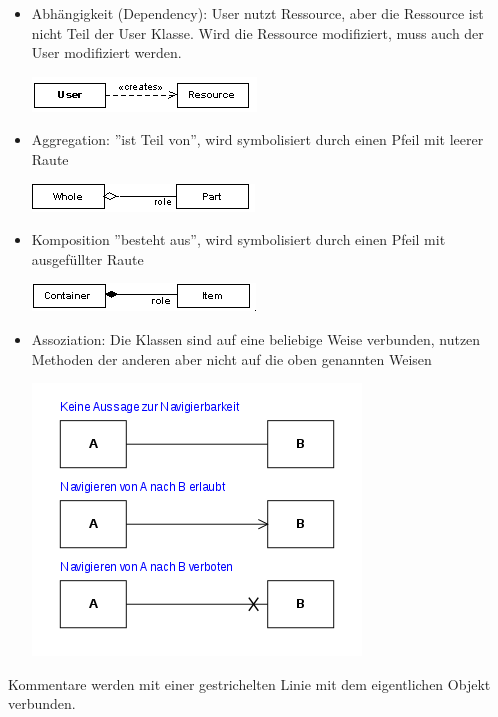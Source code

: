 \documentclass[12pt,a4]{article}
\begin{document}
	 \begin{itemize}
	 	\item Abhängigkeit (Dependency): User nutzt Ressource, aber die Ressource ist nicht Teil der User Klasse. Wird die Ressource modifiziert, muss auch der User modifiziert werden. 
	 		\begin{center}
	 		\includegraphics[width=0.5\linewidth]{images/dependency}
	 		\end{center}

		
	 	\item Aggregation: ''ist Teil von'', wird symbolisiert durch einen Pfeil mit leerer Raute
	 	\begin{center}
	 		\includegraphics[width=0.5\linewidth]{images/aggregation}
	 	\end{center}
	 	\item Komposition ''besteht aus'', wird symbolisiert durch einen Pfeil mit ausgefüllter Raute
	 	\begin{center}
	 		\includegraphics[width=0.5\linewidth]{images/composition}
	 	\end{center}
 	
 	\item Assoziation: Die Klassen sind auf eine beliebige Weise verbunden, nutzen Methoden der anderen aber nicht auf die oben genannten Weisen
 	\begin{center}
 		\includegraphics[width=0.4\linewidth]{images/association}
 	\end{center}
	 \end{itemize}
	
	Kommentare werden mit einer gestrichelten Linie mit dem eigentlichen Objekt verbunden.
	
\end{document}
